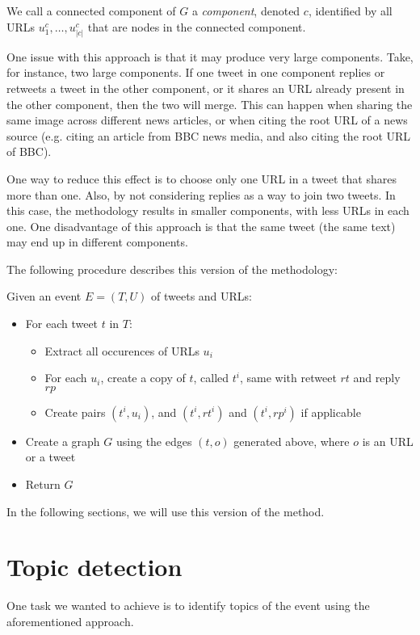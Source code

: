 \documentclass{article}
\begin{document}
We call a connected component of $G$ a \emph{component}, denoted $c$,
identified by all URLs $u^c_1, \ldots, u^c_{|c|}$ that are nodes in
the connected component.

One issue with this approach is that it may produce very large
components. Take, for instance, two large components. If one tweet in
one component replies or retweets a tweet in the other component, or
it shares an URL already present in the other component, then the two
will merge. This can happen when sharing the same image across
different news articles, or when citing the root URL of a news source
(e.g. citing an article from BBC news media, and also citing the
root URL of BBC).

One way to reduce this effect is to choose only one URL in a tweet
that shares more than one. Also, by not considering replies as a way
to join two tweets. In this case, the methodology results in smaller
components, with less URLs in each one. One disadvantage of this
approach is that the same tweet (the same text) may end up in
different components.

The following procedure describes this version of the methodology:

Given an event $E = (T, U)$ of tweets and URLs:

\begin{itemize}
\item For each tweet $t$ in $T$:
  \begin{itemize}
  \item Extract all occurences of URLs $u_i$
  \item For each $u_i$, create a copy of $t$, called $t^i$, same with
    retweet $rt$ and reply $rp$
  \item Create pairs $(t^i, u_i)$, and $(t^i, rt^i)$ and $(t^i, rp^i)$
    if applicable
  \end{itemize}
\item Create a graph $G$ using the edges $(t, o)$ generated above,
  where $o$ is an URL or a tweet
\item Return $G$
\end{itemize}

In the following sections, we will use this version of the method.


\section{Topic detection}

One task we wanted to achieve is to identify topics of the event using
the aforementioned approach.
\end{document}
